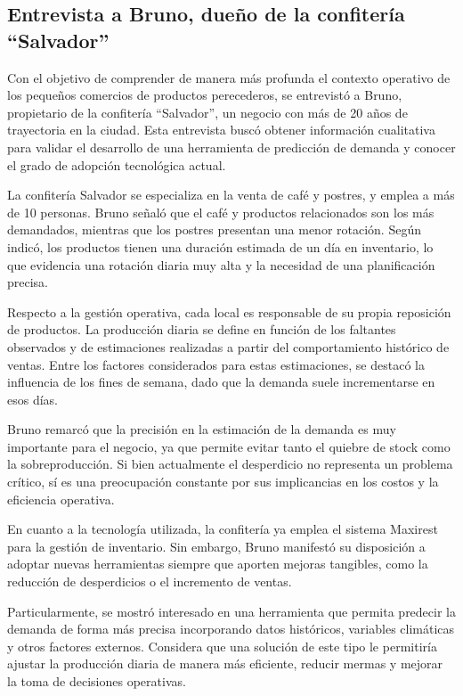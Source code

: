 \subsection{Entrevista a Bruno, dueño de la confitería ``Salvador''}

Con el objetivo de comprender de manera más profunda el contexto operativo de los pequeños comercios de productos perecederos, se entrevistó a Bruno, propietario de la confitería ``Salvador'', un negocio con más de 20 años de trayectoria en la ciudad. Esta entrevista buscó obtener información cualitativa para validar el desarrollo de una herramienta de predicción de demanda y conocer el grado de adopción tecnológica actual.

La confitería Salvador se especializa en la venta de café y postres, y emplea a más de 10 personas. Bruno señaló que el café y productos relacionados son los más demandados, mientras que los postres presentan una menor rotación. Según indicó, los productos tienen una duración estimada de un día en inventario, lo que evidencia una rotación diaria muy alta y la necesidad de una planificación precisa.

Respecto a la gestión operativa, cada local es responsable de su propia reposición de productos. La producción diaria se define en función de los faltantes observados y de estimaciones realizadas a partir del comportamiento histórico de ventas. Entre los factores considerados para estas estimaciones, se destacó la influencia de los fines de semana, dado que la demanda suele incrementarse en esos días.

Bruno remarcó que la precisión en la estimación de la demanda es muy importante para el negocio, ya que permite evitar tanto el quiebre de stock como la sobreproducción. Si bien actualmente el desperdicio no representa un problema crítico, sí es una preocupación constante por sus implicancias en los costos y la eficiencia operativa.

En cuanto a la tecnología utilizada, la confitería ya emplea el sistema Maxirest para la gestión de inventario. Sin embargo, Bruno manifestó su disposición a adoptar nuevas herramientas siempre que aporten mejoras tangibles, como la reducción de desperdicios o el incremento de ventas.

Particularmente, se mostró interesado en una herramienta que permita predecir la demanda de forma más precisa incorporando datos históricos, variables climáticas y otros factores externos. Considera que una solución de este tipo le permitiría ajustar la producción diaria de manera más eficiente, reducir mermas y mejorar la toma de decisiones operativas.

